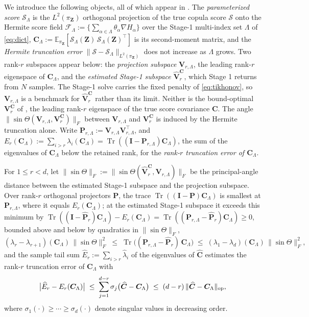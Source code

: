 \documentclass[review,hidelinks,onefignum,onetabnum]{siamart251216}
\newcommand{\EE}{\mathbb{E}}
\newcommand{\tr}{\operatorname{Tr}}
\newcommand{\mC}{\bm{C}}
\newcommand{\hmC}{\widehat{\bm{C}}}
\newcommand{\mV}{\bm{V}}
\newcommand{\hmV}{\widehat{\bm{V}}}
\newcommand{\mP}{\bm{P}}
\newcommand{\hmP}{\widehat{\bm{P}}}
\newcommand{\mI}{\bm{I}}
\newcommand{\vZ}{\bm{Z}}
\newcommand{\scS}{\mathcal{S}}
\newcommand{\scF}{\mathcal{F}}
\begin{document}
We introduce the following objects, all of which appear in . The \emph{parameterized score} $\scS_\Lambda$ is the $L^2(\pi_{\vZ})$ orthogonal projection of the true copula score $\scS$ onto the Hermite score field $\scF_\Lambda := \{\sum_{\alpha\in\Lambda}\theta_\alpha\nabla H_\alpha\}$ over the Stage-1 multi-index set $\Lambda$ of \eqref{eq:dict}, $\mC_\Lambda := \EE_{\pi_{\vZ}}[\scS_\Lambda(\vZ)\,\scS_\Lambda(\vZ)^\top]$ is its second-moment matrix, and the \emph{Hermite truncation error} $\|\scS - \scS_\Lambda\|_{L^2(\pi_{\vZ})}$ does not increase as $\Lambda$ grows. Two rank-$r$ subspaces appear below: the \emph{projection subspace} $\mV_{r,\Lambda}$, the leading rank-$r$ eigenspace of $\mC_\Lambda$, and the \emph{estimated Stage-1 subspace} $\hmV_r^{\mC}$, which Stage 1 returns from $N$ samples. The Stage-1 solve carries the fixed penalty of \eqref{eq:tikhonov}, so $\mV_{r,\Lambda}$ is a benchmark for $\hmV_r^{\mC}$ rather than its limit. Neither is the bound-optimal $\mV_r^{\mC}$ of , the leading rank-$r$ eigenspace of the true score covariance $\mC$. The angle $\|\sin\Theta(\mV_{r,\Lambda}, \mV_r^{\mC})\|_F$ between $\mV_{r,\Lambda}$ and $\mV_r^{\mC}$ is induced by the Hermite truncation alone. Write $\mP_{r,\Lambda} := \mV_{r,\Lambda}\mV_{r,\Lambda}^\top$, and $E_r(\mC_\Lambda) := \sum_{i>r}\lambda_i(\mC_\Lambda) = \tr((\mI-\mP_{r,\Lambda})\mC_\Lambda)$, the sum of the eigenvalues of $\mC_\Lambda$ below the retained rank, for the \emph{rank-$r$ truncation error of $\mC_\Lambda$}.

\begin{proposition}
\label{prop:diagnostic}
For $1 \le r < d$, let $\|\sin\Theta\|_F := \|\sin\Theta(\hmV_r^{\mC}, \mV_{r,\Lambda})\|_F$ be the principal-angle distance between the estimated Stage-1 subspace and the projection subspace. Over rank-$r$ orthogonal projectors $\mP$, the trace $\tr((\mI-\mP)\mC_\Lambda)$ is smallest at $\mP_{r,\Lambda}$, where it equals $E_r(\mC_\Lambda)$; at the estimated Stage-1 subspace it exceeds this minimum by $\tr((\mI-\hmP_r)\mC_\Lambda) - E_r(\mC_\Lambda) = \tr((\mP_{r,\Lambda}-\hmP_r)\mC_\Lambda) \ge 0$, bounded above and below by quadratics in $\|\sin\Theta\|_F$,
\begin{equation}
  (\lambda_r-\lambda_{r+1})(\mC_\Lambda)\,\|\sin\Theta\|_F^2
  \;\le\;
  \tr\bigl((\mP_{r,\Lambda}-\hmP_r)\,\mC_\Lambda\bigr)
  \;\le\;
  (\lambda_1-\lambda_d)(\mC_\Lambda)\,\|\sin\Theta\|_F^2,
  \label{eq:misalign-quadratic}
\end{equation}
and the sample tail sum $\widehat E_r := \sum_{i>r}\widehat\lambda_i$ of the eigenvalues of $\hmC$ estimates the rank-$r$ truncation error of $\mC_\Lambda$ with
\begin{equation}
  \bigl|\widehat E_r - E_r(\mC_\Lambda)\bigr| \;\le\; \sum_{j=1}^{d-r}\sigma_j\bigl(\hmC - \mC_\Lambda\bigr) \;\le\; (d-r)\,\|\hmC - \mC_\Lambda\|_{\rm op},
  \label{eq:Ehat-weyl}
\end{equation}
where $\sigma_1(\cdot) \ge \cdots \ge \sigma_d(\cdot)$ denote singular values in decreasing order.
\end{proposition}
\end{document}
